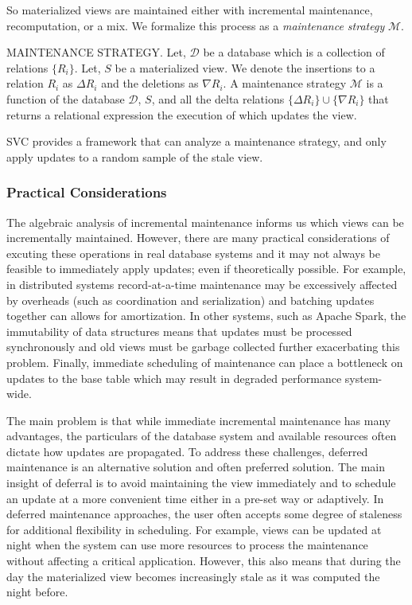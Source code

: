 So materialized views are maintained either with incremental maintenance, recomputation, or a mix.
We formalize this process as a \emph{maintenance strategy} $\mathcal{M}$.
\begin{definition} MAINTENANCE STRATEGY.
Let, $\mathcal{D}$ be a database which is a collection of relations $\{R_i\}$.
Let, $S$ be a materialized view.
We denote the insertions to a relation $R_i$ as $\Delta R_i$ and the deletions as $\nabla R_i$.
A maintenance strategy $\mathcal{M}$ is a function of the database $\mathcal{D}$, $S$, and all the delta relations $\{\Delta R_i\} \cup \{\nabla R_i\}$ that returns a relational expression the execution of which updates the view. 
\end{definition}


SVC provides a framework that can analyze a maintenance strategy, and only apply updates to a random sample of the stale view.

\subsubsection{Practical Considerations}
The algebraic analysis of incremental maintenance \cite{DBLP:journals/vldb/KochAKNNLS14, DBLP:conf/pods/Koch10} informs us which views can be incrementally maintained.
However, there are many practical considerations of excuting these operations in real database systems and it may not always be feasible to immediately apply updates; even if theoretically possible.
For example, in distributed systems record-at-a-time maintenance may be excessively affected by overheads (such as coordination and serialization) and batching updates together can allows for amortization.
In other systems, such as Apache Spark, the immutability of data structures means that updates must be processed synchronously and old views must be garbage collected further exacerbating this problem.
Finally, immediate scheduling of maintenance can place a bottleneck on updates to the base table which may result in degraded performance system-wide.

The main problem is that while immediate incremental maintenance has many advantages, the particulars of the database system and available resources often dictate how updates are propagated.
To address these challenges, deferred maintenance is an alternative solution and often preferred solution.
The main insight of deferral is to avoid maintaining the view immediately and to schedule an update at a more convenient time either in a pre-set way or adaptively.
In deferred maintenance approaches, the user often accepts some degree of staleness for additional flexibility in scheduling.
For example, views can be updated at night when the system can use more resources to process the maintenance without affecting a critical application.
However, this also means that during the day the materialized view becomes increasingly stale as it was computed the night before.


